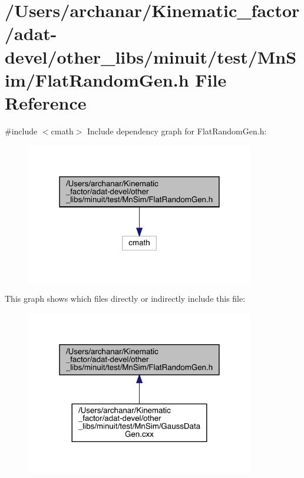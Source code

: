 \hypertarget{adat-devel_2other__libs_2minuit_2test_2MnSim_2FlatRandomGen_8h}{}\section{/\+Users/archanar/\+Kinematic\+\_\+factor/adat-\/devel/other\+\_\+libs/minuit/test/\+Mn\+Sim/\+Flat\+Random\+Gen.h File Reference}
\label{adat-devel_2other__libs_2minuit_2test_2MnSim_2FlatRandomGen_8h}
{\ttfamily \#include $<$cmath$>$}\newline
Include dependency graph for Flat\+Random\+Gen.\+h\+:
\nopagebreak
\begin{figure}[H]
\begin{center}
\leavevmode
\includegraphics[width=283pt]{d8/dc6/adat-devel_2other__libs_2minuit_2test_2MnSim_2FlatRandomGen_8h__incl}
\end{center}
\end{figure}
This graph shows which files directly or indirectly include this file\+:
\nopagebreak
\begin{figure}[H]
\begin{center}
\leavevmode
\includegraphics[width=283pt]{db/d59/adat-devel_2other__libs_2minuit_2test_2MnSim_2FlatRandomGen_8h__dep__incl}
\end{center}
\end{figure}
